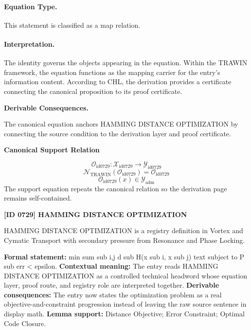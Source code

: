 \paragraph{Equation Type.}
This statement is classified as a map relation.

\paragraph{Interpretation.}
The identity governs the objects appearing in the equation. Within the TRAWIN framework, the equation functions as the mapping carrier for the entry’s information content. According to CHL, the derivation provides a certificate connecting the canonical proposition to its proof certificate.

\par\vspace{0.35em}
\noindent\textbf{Derivable Consequences.}\quad
\begingroup
\footnotesize
\raggedright
The canonical equation anchors HAMMING DISTANCE OPTIMIZATION by connecting the source condition to the derivation layer and proof certificate.
\par\endgroup

\noindent\textbf{Canonical Support Relation}\par
\[
\mathcal{O}_{\mathrm{id0729}}:\mathcal{X}_{\mathrm{id0729}}\longrightarrow\mathcal{Y}_{\mathrm{id0729}}
\]
\[
\mathcal{N}_{\mathrm{TRAWIN}}(\mathcal{O}_{\mathrm{id0729}})=\mathcal{O}_{\mathrm{id0729}}
\]
\[
\mathcal{O}_{\mathrm{id0729}}(x)\in\mathcal{Y}_{\mathrm{adm}}
\]
\noindent The support equation repeats the canonical relation so the derivation page remains self-contained.\par

\clearpage
\noindent\textbf{[ID 0729] HAMMING DISTANCE OPTIMIZATION}\par
\vspace{0.35em}
\begingroup\small
{}
HAMMING DISTANCE OPTIMIZATION is a registry definition in Vortex and Cymatic Transport with secondary pressure from Resonance and Phase Locking.

\begingroup\footnotesize\setlength{\emergencystretch}{3em}\sloppy
\textbf{Formal statement:} min sum sub i,j d sub H(x sub i, x sub j) text subject to P sub err < epsilon. \textbf{Contextual meaning:} The entry reads HAMMING DISTANCE OPTIMIZATION as a controlled technical headword whose equation layer, proof route, and registry role are interpreted together. \textbf{Derivable consequences:} The entry now states the optimization problem as a real objective-and-constraint progression instead of leaving the raw source sentence in display math. \textbf{Lemma support:} Distance Objective; Error Constraint; Optimal Code Closure.\par
\endgroup

